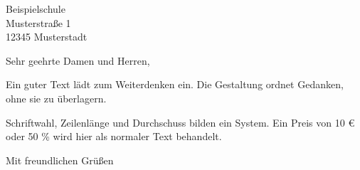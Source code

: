 \documentclass[11pt,a4paper,ngerman]{scrlttr2}
\begin{document}
\begin{letter}{Beispielschule\\
Musterstraße 1\\
12345 Musterstadt}
\opening{Sehr geehrte Damen und Herren,}
Ein guter Text lädt zum Weiterdenken ein. Die Gestaltung ordnet Gedanken, ohne sie zu überlagern.

Schriftwahl, Zeilenlänge und Durchschuss bilden ein System. Ein Preis von 10 € oder 50 \% wird hier als normaler Text behandelt.
\closing{Mit freundlichen Grüßen}
\end{letter}
\end{document}
